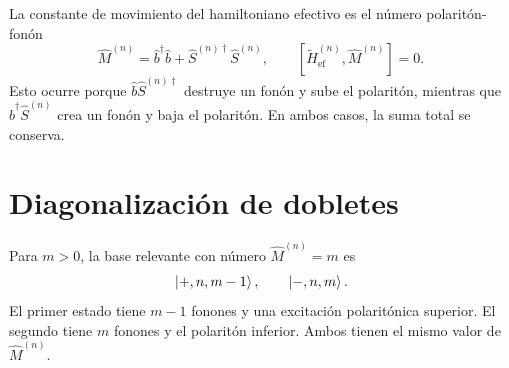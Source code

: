 \documentclass[11pt]{article}
\newcommand{\bdag}{\hat b^\dagger}
\begin{document}
La constante de movimiento del hamiltoniano efectivo es el n\'umero
polarit\'on-fon\'on
\begin{equation}
  \boxed{
  \hat M^{(n)}
  =
  \bdag\hat b+\hat S^{(n)\dagger}\hat S^{(n)},
  \qquad
  [\tilde H_{\mathrm{ef}}^{(n)},\hat M^{(n)}]=0.
  }
\end{equation}
Esto ocurre porque $\hat b\hat S^{(n)\dagger}$ destruye un fon\'on y sube el
polarit\'on, mientras que $\bdag\hat S^{(n)}$ crea un fon\'on y baja el
polarit\'on. En ambos casos, la suma total se conserva.

\section{Diagonalizaci\'on de dobletes}

Para $m>0$, la base relevante con n\'umero $\hat M^{(n)}=m$ es
\begin{equation}
  \ket{+,n,m-1},
  \qquad
  \ket{-,n,m}.
\end{equation}
El primer estado tiene $m-1$ fonones y una excitaci\'on polarit\'onica
superior. El segundo tiene $m$ fonones y el polarit\'on inferior. Ambos tienen
el mismo valor de $\hat M^{(n)}$.
\end{document}
